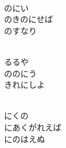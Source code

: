 \documentclass[10pt,b5j]{tarticle} %
\begin{document}
\vspace{1.5em} %
\newcommand{\linespace}{0.5em} %
\newcommand{\blocksize}{0.5\hsize} %
\newcommand{\itemmargin}{3em} %
\begin{enumerate} %
    \setlength{\itemindent}{\itemmargin} %
    \begin{minipage}[c]{\blocksize}
    
        \vspace{\linespace}
        \item~\\
        のにい\\
        のきのにせば\\
        のすなり
        
    \end{minipage}
    \begin{minipage}[c]{\blocksize}
        
        \vspace{\linespace}
        \item~\\
        るるや\\
        ののにう\\
        きれにしよ
        
    \end{minipage}
    \begin{minipage}[c]{\blocksize}
        
        \vspace{\linespace}
        \item~\\
        にくの\\
        にあくがれえば\\
        にのはえぬ
        
    \end{minipage}
    \begin{minipage}[c]{\blocksize}
        

\end{minipage}
\end{enumerate}
\end{document}
